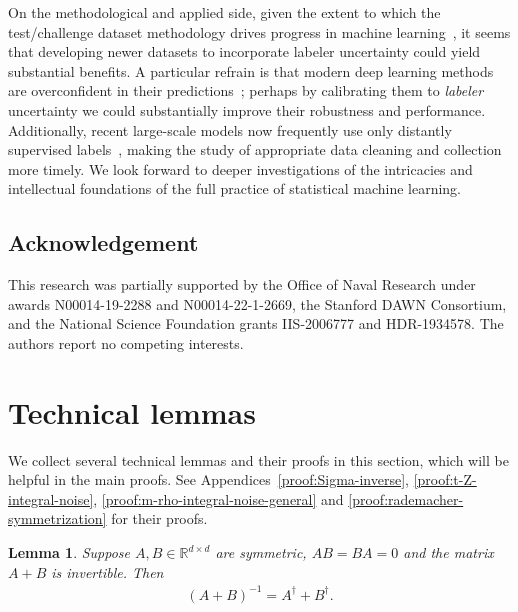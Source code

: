 \documentclass[11pt]{article}
\newcommand{\<}{\langle} %
\renewcommand{\>}{\rangle}
\newtheorem{lemma}[claim]{Lemma}
\begin{document}
On the methodological and applied side, given the extent to which the
test/challenge dataset methodology drives progress in machine
learning~\cite{Donoho17}, it seems that developing newer datasets to
incorporate labeler uncertainty could yield substantial benefits.  A
particular refrain is that modern deep learning methods are overconfident in
their predictions~\cite{GoodfellowShSz15, ZhangBeHaReVi21}; perhaps by
calibrating them to \emph{labeler} uncertainty we could substantially
improve their robustness and performance. Additionally, recent large-scale
models now frequently use only distantly supervised
labels~\cite{RadfordKiHaRaGoAgSaAsMiClKrSu21,
  SchuhmannBeVeGoWiChCoKaMuWoScKuCrScKaJi22, GadreEtAl23}, making
the study of appropriate data cleaning and collection more timely.
We look forward to deeper
investigations of the intricacies and intellectual foundations of the full
practice of statistical machine learning.


\subsection*{Acknowledgement}

This research was partially supported by the Office of Naval Research under
awards N00014-19-2288 and N00014-22-1-2669, the Stanford DAWN Consortium,
and the National Science Foundation grants IIS-2006777 and HDR-1934578.
The authors report no competing interests.



\newpage

\appendix
\section{Technical lemmas} \label{sec:technical}

We collect several technical lemmas and their proofs in this section, which
will be helpful in the main proofs. See
Appendices~\ref{proof:Sigma-inverse}, \ref{proof:t-Z-integral-noise},
\ref{proof:m-rho-integral-noise-general} and
\ref{proof:rademacher-symmetrization} for their proofs.

\begin{lemma} \label{lem:Sigma-inverse}
  Suppose $A, B \in \mathbb{R}^{d \times d}$ are symmetric, $AB = BA = 0$
  and the matrix $A+B$ is invertible. Then
  \begin{align*}
    \left(A +B\right)^{-1} = A^\dagger + B^\dagger.
  \end{align*}
\end{lemma}
\end{document}
